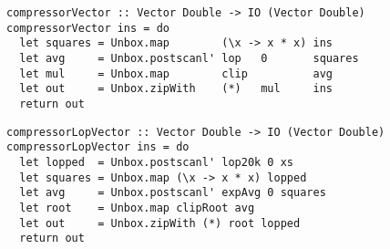 \begin{lstlisting}[float,label=l:a:bench:compressorVector,caption=Vector implementation of \Hs/compressor/]
compressorVector :: Vector Double -> IO (Vector Double)
compressorVector ins = do
  let squares = Unbox.map        (\x -> x * x) ins
  let avg     = Unbox.postscanl' lop   0       squares
  let mul     = Unbox.map        clip          avg
  let out     = Unbox.zipWith    (*)   mul     ins
  return out
\end{lstlisting}


\begin{lstlisting}[float,label=l:a:bench:compressorLopVector,caption=Vector implementation of \Hs/compressor/ with low-pass]
compressorLopVector :: Vector Double -> IO (Vector Double)
compressorLopVector ins = do
  let lopped  = Unbox.postscanl' lop20k 0 xs
  let squares = Unbox.map (\x -> x * x) lopped
  let avg     = Unbox.postscanl' expAvg 0 squares
  let root    = Unbox.map clipRoot avg
  let out     = Unbox.zipWith (*) root lopped
  return out
\end{lstlisting}

% 

